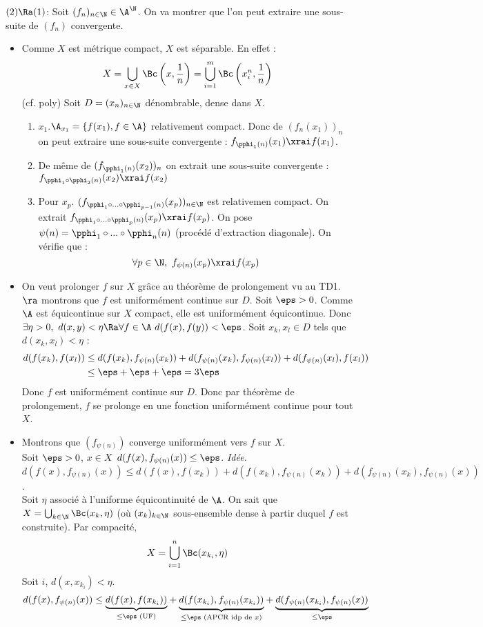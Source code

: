 \prvv
$(2)\Ra(1)$:\dl
Soit $(f_n)_{n\in\N}\in\A^\N$. On va montrer que l'on peut extraire une sous-suite de $(f_n)$ convergente.
\begin{itemize}
  \item Comme $X$ est métrique compact, $X$ est séparable. En effet :
    $$X=\bigcup_{x\in X}\Bc\left(x,\frac 1 n\right)=\bigcup_{i=1}^m\Bc\left(x_i^n,\frac 1 n\right)$$
    (cf. poly)
    \dl Soit $D=(x_n)_{n\in\N}$ dénombrable, dense dans $X$.
    \begin{enumerate}
      \item $x_1$.\quad $\A_{x_1}=\{f(x_1), f\in\A\}$ relativement compact. Donc de $(f_n(x_1))_n$ on peut extraire une sous-suite convergente : $f_{\pphi_1(n)}(x_1)\xrai f(x_1)$.
      \item De même de $(f_{\pphi_1(n)}(x_2))_n$ on extrait une sous-suite convergente : $f_{\pphi_1\circ\pphi_2(n)}(x_2)\xrai f(x_2)$
      \item Pour $x_p$. $(f_{\pphi_1\circ...\circ\pphi_{p-1}(n)}(x_p))_{n\in\N}$ est relativemen compact. On extrait $f_{\pphi_1\circ...\circ\pphi_p(n)}(x_p)\xrai f(x_p)$. On pose $\psi(n)=\pphi_1\circ...\circ\pphi_n(n)$ (procédé d'extraction diagonale).
        \dl On vérifie que : 
          $$\forall p\in\N,\ f_{\psi(n)}(x_p)\xrai f(x_p)$$
    \end{enumerate}
  \item On veut prolonger $f$ sur $X$ grâce au théorème de prolongement vu au TD1. $\ra$ montrons que $f$ est uniformément continue sur $D$.
    \dl Soit $\eps>0$. Comme $\A$ est équicontinue sur $X$ compact, elle est uniformément équicontinue. Donc $\exists\eta>0,\ d(x,y)<\eta\Ra\forall f\in\A\ d(f(x),f(y))<\eps$. Soit $x_k,x_l\in D$ tels que $d(x_k,x_l)<\eta$ :
    \begin{align*}
      d(f(x_k),f(x_l))&\le d(f(x_k),f_{\psi(n)}(x_k))+d(f_{\psi(n)}(x_k),f_{\psi(n)}(x_l))+d(f_{\psi(n)}(x_l),f(x_l))\\
        &\le \eps + \eps +\eps = 3\eps
    \end{align*}
    Donc $f$ est uniformément continue sur $D$. Donc par théorème de prolongement, $f$ se prolonge en une fonction uniformément continue pour tout $X$.
  \item Montrons que $(f_{\psi(n)})$ converge uniformément vers $f$ sur $X$. \\ Soit $\eps>0$, $x\in X$\ $d(f(x),f_{\psi(n)}(x))\le\eps$.
    \dl \emph{Idée.}\quad $d(f(x),f_{\psi(n)}(x))\le d(f(x),f(x_k))+d(f(x_k),f_{\psi(n)}(x_k))+d(f_{\psi(n)}(x_k),f_{\psi(n)}(x))$. 
    \\ Soit $\eta$ associé à l'uniforme équicontinuité de $\A$. On sait que $X=\bigcup_{k\in\N}\Bc(x_k,\eta)$ (où $(x_k)_{k\in\N}$ sous-ensemble dense à partir duquel $f$ est construite). Par compacité, 
    $$X=\bigcup_{i=1}^n\Bc(x_{k_i},\eta)$$
    Soit $i$, $d(x,x_{k_i})<\eta$.
    $$d(f(x),f_{\psi(n)}(x))\le \underset{\le\eps\text{ (UF)}}{\underbrace{d(f(x),f(x_{k_i}))}}+\underset{\le\eps\text{ (APCR idp de }x)}{\underbrace{d(f(x_{k_i}),f_{\psi(n)}(x_{k_i}))}}+\underset{\le\eps}{\underbrace{d(f_{\psi(n)}(x_{k_i}),f_{\psi(n)}(x))}}$$
\end{itemize}

